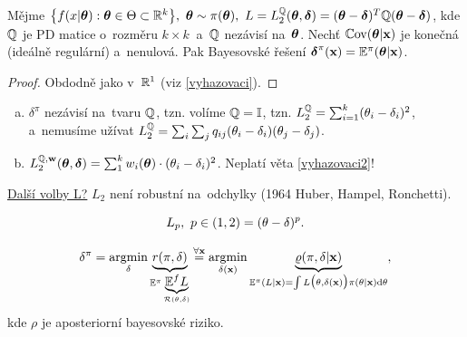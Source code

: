 \begin{theorem}\label{vyhazovaci2}
	Mějme $\big\{ f(x|\boldsymbol{\theta}):\boldsymbol{\theta}\in\Theta\subset\mathbb{R}^k \big\},~\boldsymbol{\theta}\sim\pi(\boldsymbol{\theta}),~L=L_2^{\mathbb{Q}}(\boldsymbol{\theta},\boldsymbol{\delta})=(\boldsymbol{\theta}-\boldsymbol{\delta})^T\mathbb{Q}(\boldsymbol{\theta}-\boldsymbol{\delta})$, kde $\mathbb{Q}$ je PD matice o~rozměru $k\times k~$ a~$\mathbb{Q}$ nezávisí na~$\boldsymbol{\theta}$. Nechť $\mathbb{C}\mathrm{ov}(\boldsymbol{\theta}|\textbf{x})$ je konečná (ideálně regulární) a~nenulová. Pak Bayesovské řešení $\boldsymbol{\delta}^\pi(\textbf{x})=\mathbb{E}^\pi(\boldsymbol{\theta}|\textbf{x})$. 
	\begin{proof}
		Obdodně jako v~$\mathbb{R}^1$ (viz \ref{vyhazovaci}).
	\end{proof}
\end{theorem}
\begin{remark}
	\begin{enumerate}[a)]
		\item $\delta^\pi$ nezávisí na~tvaru $\mathbb{Q}$, tzn. volíme $\mathbb{Q}=\mathbb{I}$, tzn. $L_2^{\mathbb{Q}}=\sum_{i=1}^k (\theta_i-\delta_i)^2$, a~nemusíme užívat $L_2^{\mathbb{Q}}=\sum_i\sum_j q_{ij}(\theta_i-\delta_i)(\theta_j-\delta_j)$.
		\item $L_2^{\mathbb{Q},\textbf{w}}(\boldsymbol{\theta},\boldsymbol{\delta})=\sum_1^k w_i(\boldsymbol{\theta})\cdot(\theta_i-\delta_i)^2$. Neplatí věta \ref{vyhazovaci2}! 
	\end{enumerate}
\end{remark}

\underline{Další volby L?}
$L_2$ není robustní na~odchylky (1964 Huber, Hampel, Ronchetti). 

$$ L_p,~p\in(1,2)=(\theta-\delta)^p.$$

$$\delta^\pi=\mathop{\mathrm{argmin}}_\delta \underbrace{r(\pi,\delta)}_{\mathbb{E}^\pi\underbrace{\mathbb{E}^f L}_{\mathcal{R}(\theta,\delta)}}\stackrel{\forall\textbf{x}}{=}\mathop{\mathrm{argmin}}_{\delta(\textbf{x})}\underbrace{\varrho(\pi,\delta|\textbf{x})}_{\mathbb{E}^\pi(L|\textbf{x})=\int L\big(\theta,\delta(\textbf{x})\big)\pi(\theta|\textbf{x})\mathrm{d}\theta},$$ kde $\rho$ je aposteriorní bayesovské riziko.


